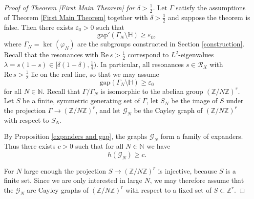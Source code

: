 \documentclass[12pt]{article}
\newcommand{\ZZ}{\mathbb{Z}}
\newcommand{\NN}{\mathbb{N}}
\newcommand{\R}{\mathrm{Re}\,}
\newcommand{\HH}{\mathbb{H}}
\begin{document}
\begin{proof}[Proof of Theorem \ref{First Main Theorem} for $ \delta > \frac{1}{2} $] 
Let $ \Gamma $ satisfy the assumptions of Theorem \ref{First Main Theorem} together with $ \delta > \frac{1}{2} $ and suppose the theorem is false. Then there exists $ \varepsilon_{0} > 0 $ such that 
$$ \mathrm{gap}'(\Gamma_{N}\setminus \HH) \geq \varepsilon_{0}, $$
where $ \Gamma_{N} = \ker(\varphi_{N}) $ are the subgroups constructed in Section \ref{construction}. Recall that the resonances with $ \R s > \frac{1}{2} $ correspond to $ L^{2} $-eigenvalues $ \lambda = s(1-s) \in [\delta(1-\delta), \frac{1}{4})  $. In particular, all resonances $ s\in \mathcal{R}_{X} $ with $ \R s > \frac{1}{2} $ lie on the real line, so that we may assume 
$$ \mathrm{gap}(\Gamma_{N}\setminus \HH) \geq \varepsilon_{0} $$
for all $ N\in \NN $. Recall that $ \Gamma/ \Gamma_{N} $ is isomorphic to the abelian group $ (\ZZ/N\ZZ)^{r} $. Let $ S $ be a finite, symmetric generating set of $ \Gamma $, let $ S_{N} $ be the image of $ S $ under the projection $ \Gamma \to (\ZZ/N\ZZ)^{r} $, and let $ \mathcal{G}_{N} $ be the Cayley graph of $ (\ZZ/N\ZZ)^{r} $ with respect to $ S_{N} $. 

By Proposition \ref{expanders and gap}, the graphs $ \mathcal{G}_{N} $ form a family of expanders. Thus there exists $ c>0 $ such that for all $ N\in \NN $ we have
\begin{equation}\label{isoperm}
h(\mathcal{G}_{N}) \geq c.
\end{equation}

For $ N $ large enough the projection $ S \to (\ZZ/N\ZZ)^{r} $ is injective, because $ S $ is a finite set. Since we are only interested in large $ N $, we may therefore assume that the $ \mathcal{G}_{N} $ are Cayley graphs of $ (\ZZ/N\ZZ)^{r} $ with respect to a fixed set of $ S\subset \ZZ^{r} $.


\end{proof}
\end{document}

